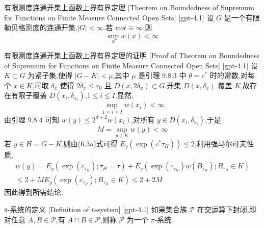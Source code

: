 \documentclass[UTF8]{ctexart}
\begin{document}
    
    
    \begin{thm}
        {有限测度连通开集上函数上界有界定理}
        [Theorem on Boundedness of Supremum for Functions on Finite Measure Connected Open Sets]
        [gpt-4.1]
        设 $G$ 是一个有限勒贝格测度的连通开集,$|G| < \infty$.若 $w 
ot\equiv \infty$,则
\[
\operatorname{sup}_{x} w(x) < \infty
\]

    \end{thm}
    
    
    
    \begin{prf}
        {有限测度连通开集上函数上界有界定理的证明}
        [Proof of Theorem on Boundedness of Supremum for Functions on Finite Measure Connected Open Sets]
        [gpt-4.1]
        设 $K \subset G$ 为紧子集,使得 $|G-K| < \mu$,其中 $\mu$ 是引理 9.8.3 中 $\theta = c^{*}$ 时的常数.对每个 $x \in K$,可取 $\delta_{x}$ 使得 $2\delta_{x} \leq r_{0}$ 且 $D(x, 2\delta_{x}) \subset G$.开集 $D(x, \delta_{x})$ 覆盖 $K$,故存在有限子覆盖 $D(x_{i}, \delta_{x_{i}})$,$1 \leq i \leq I$.显然,
\[
\operatorname{sup}_{1 \leq i \leq I} w(x_{i}) < \infty
\]
由引理 9.8.4 可知 $w(y) \leq 2^{d+2} w(x_{i})$,对所有 $y \in D(x_{i}, \delta_{x_{i}})$,于是
\[
M = \operatorname{sup}_{y \in K} w(y) < \infty
\]
若 $y \in H = G - K$,则由(6.3a)式可得 $E_{y} ( \exp ( c^{*} \tau_{H} ) ) \leq 2$,利用强马尔可夫性质,
\[
\begin{array}{rl}
w(y) = E_{y} ( \exp ( c_{\tau_{H}} ) ; \tau_{H} = \tau ) + E_{y} ( \exp ( c_{\tau_{H}} ) w(B_{\tau_{H}}) ; B_{\tau_{H}} \in K ) \\
\leq 2 + M E_{y} ( \exp ( c_{\tau_{H}} ) ; B_{\tau_{H}} \in K ) \leq 2 + 2M
\end{array}
\]
因此得到所需结论.

    \end{prf}
    
    
    
    \begin{dfn}
        {π-系统的定义}
        [Definition of π-system]
        [gpt-4.1]
        如果集合族 $\mathcal{P}$ 在交运算下封闭,即对任意 $A, B \in \mathcal{P}$,有 $A \cap B \in \mathcal{P}$,则称 $\mathcal{P}$ 为一个 $\pi$-系统.
    \end{dfn}
    
\end{document}
